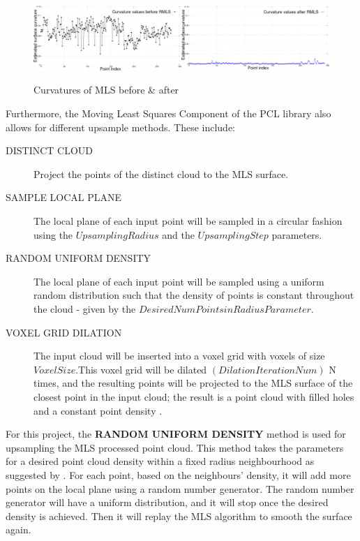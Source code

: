 \documentclass[12pt]{report}
\begin{document}
\begin{figure}[H]%
  \centering
  \includegraphics[width=1\textwidth]{resampling_2.jpg}
 \caption{Curvatures of MLS before \& after}\cite[]{Rusu_ICRA2011_PCL}
 \label{fig:smoothing_curvature} 
\end{figure}

\newpage
Furthermore, the Moving Least Squares Component of the PCL library also allows for different upsample methods. 
These include:
\begin{description}
  \item[DISTINCT CLOUD] Project the points of the distinct cloud to the MLS surface\cite[]{Rusu_ICRA2011_PCL}.
  \item[SAMPLE LOCAL PLANE] The local plane of each input point will be sampled in a circular fashion using the $UpsamplingRadius$  and the $UpsamplingStep$ parameters\cite[]{Rusu_ICRA2011_PCL}. 
  \item[RANDOM UNIFORM DENSITY] The local plane of each input point will be sampled using a uniform random distribution such that the density of points is constant throughout the cloud - given by the $Desired Num Points in Radius Parameter$\cite[]{Rusu_ICRA2011_PCL}. 
  \item[VOXEL GRID DILATION] The input cloud will be inserted into a voxel grid with voxels of size $Voxel Size$.This voxel grid will be dilated $(Dilation Iteration Num)$ N times, and the resulting points will be projected to the MLS surface of the closest point in the input cloud; the result is a point cloud with filled holes and a constant point density \cite[]{Rusu_ICRA2011_PCL}.
\end{description}

For this project,  the \textbf {RANDOM UNIFORM DENSITY} method is used for upsampling the MLS processed point cloud. 
This method takes the parameters for a desired point cloud density within a fixed radius neighbourhood as suggested by . 
For each point, based on the neighbours' density, it will add more points on the local plane using a random number generator.
The random number generator will have a uniform distribution, and it will stop once the desired density is achieved. Then it will replay the MLS algorithm to smooth the surface again.
\end{document}
